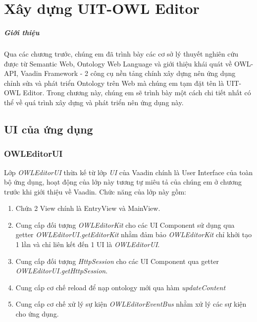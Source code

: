 \chapter{Xây dựng UIT-OWL Editor}
\paragraph{Giới thiệu} Qua các chương trước, chúng em đã trình bày các cơ sở lý thuyết nghiên cứu được từ Semantic Web, Ontology Web Language và giới thiệu khái quát về OWL-API, Vaadin Framework - 2 công cụ nền tảng chính xây dựng nên ứng dụng chỉnh sửa và phát triển Ontology trên Web mà chúng em tạm đặt tên là UIT-OWL Editor. Trong chương này, chúng em sẽ trình bày một cách chi tiết nhất có thể về quá trình xây dựng và phát triển nên ứng dụng này.
\section{UI của ứng dụng}
\subsection{OWLEditorUI}
Lớp \textit{OWLEditorUI} thừa kế từ lớp \textit{UI} của Vaadin chính là User Interface của toàn bộ ứng dụng, hoạt động của lớp này tương tự miêu tả của chúng em ở chương trước khi giới thiệu về Vaadin. Chức năng của lớp này gồm:
\begin{enumerate}
	\item Chứa 2 View chính là EntryView và MainView.
	\item Cung cấp đối tượng \textit{OWLEditorKit} cho các UI Component sử dụng qua getter \textit{OWLEditorUI.getEditorKit} nhằm đảm bảo \textit{OWLEditorKit} chỉ khởi tạo 1 lần và chỉ liên kết đến 1 UI là \textit{OWLEditorUI}.
	\item Cung cấp đối tượng \textit{HttpSession} cho các UI Component qua getter \textit{OWLEditorUI.getHttpSession}.
	\item Cung cấp cơ chế reload để nạp ontology mới qua hàm \textit{updateContent}
	\item Cung cấp cơ chế xử lý sự kiện \textit{OWLEditorEventBus} nhằm xử lý các sự kiện cho ứng dụng.
\end{enumerate}
%
